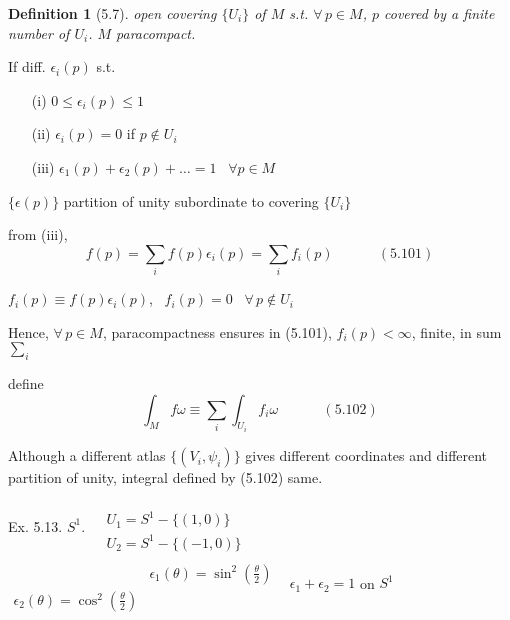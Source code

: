 \documentclass{book}
\newtheorem{definition}{Definition}
\begin{document}
\begin{definition}[5.7]
  open covering $\lbrace U_i \rbrace$ of $M$ s.t. $\forall \, p \in M$, $p$ covered by a finite number of $U_i$.  $M$ paracompact.  
\end{definition}

If diff. $\epsilon_i(p)$ s.t. \begin{enumerate}
\item[(i)] $0\leq \epsilon_i(p) \leq 1$ 
\item[(ii)] $\epsilon_i(p) =0 $ if $p \notin U_i$ 
\item[(iii)] $\epsilon_1(p) + \epsilon_2(p) + \dots = 1$ \quad \, $\forall p \in M$
\end{enumerate}

$\lbrace \epsilon(p) \rbrace$ partition of unity subordinate to covering $\lbrace U_i \rbrace$

from (iii), 
\begin{equation}
  f(p) = \sum_i f(p) \epsilon_i(p) = \sum_i f_i(p) \quad \quad \quad \, (5.101)
\end{equation}

$f_i(p) \equiv f(p) \epsilon_i(p)$, \, $f_i(p) =0$ \, $\forall \, p \notin U_i$

 Hence, $\forall \, p \in M$, paracompactness ensures in (5.101),  $f_i(p) < \infty  $, finite, in sum $\sum_i$

define
\begin{equation}
\int_M f \omega \equiv \sum_i \int_{U_i} f_i \omega \quad \quad \quad \, (5.102)
\end{equation}

Although a different atlas $\lbrace (V_i, \psi_i)\rbrace$ gives different coordinates and different partition of unity, integral defined by (5.102) same.  

Ex. 5.13. $S^1$.  $\begin{aligned} & \quad \\ & U_1 = S^1 - \lbrace (1,0) \rbrace \\ & U_2 = S^1 - \lbrace (-1,0) \rbrace \end{aligned}$ \quad \quad \, $\begin{aligned} & \quad \\ & \epsilon_1(\theta) = \sin^2{ \left( \frac{ \theta}{2} \right) } \\ \epsilon_2(\theta) = \cos^2{ \left( \frac{\theta}{2} \right) } \end{aligned}$ \quad \quad \, $\epsilon_1 + \epsilon_2 = 1 $ on $S^1$
\end{document}
